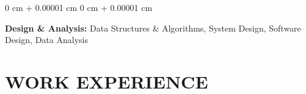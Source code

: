 \documentclass[10pt, letterpaper]{article}
\newenvironment{onecolentry}{
    \begin{adjustwidth}{
        0 cm + 0.00001 cm
    }{
        0 cm + 0.00001 cm
    }
}{
    \end{adjustwidth}
} %
\begin{document}
        \vspace{0.1 cm}
        \begin{onecolentry}
        \textbf{Design \& Analysis:} Data Structures \& Algorithms, System Design, Software Design, Data Analysis
        \end{onecolentry}

        
    \vspace{0.1 cm}    
    \section{WORK EXPERIENCE}
    \vspace{0.1 cm}
        
\end{document}
